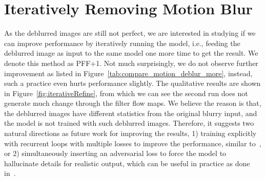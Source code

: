 \section{Iteratively Removing Motion Blur }
As the deblurred images are still not perfect,
we are interested in studying if we can improve performance by iteratively running the model, i.e.,
feeding the deblurred image as input to the same model one more time to get the result.
We denote this method as PFF+1.
Not much surprisingly,
we do not observe further improvement as listed in
Figure~\ref{tab:compare_motion_deblur_more}, instead,
such a practice even hurts performance slightly.
The qualitative results are shown in Figure~\ref{fig:iterativeRefine},
from which we can see the second run does not generate much change through the filter flow maps.
We believe the reason is that,
the deblurred images have different statistics from the original blurry input,
and the model is not trained with such deblurred images.
Therefore, it suggests two natural directions as future work for improving the results,
1) training explicitly with recurrent loops with multiple losses to improve the performance,
similar to~\cite{belagiannis2017recurrent,li2016iterative,romera2016recurrent,
kong2017recurrentSceneParsing,kong2018pixel},
or 2) simultaneously inserting an adversarial loss to force the model to hallucinate
details for realistic output, which can be useful in practice as done in~\cite{ledig2017photo}.


